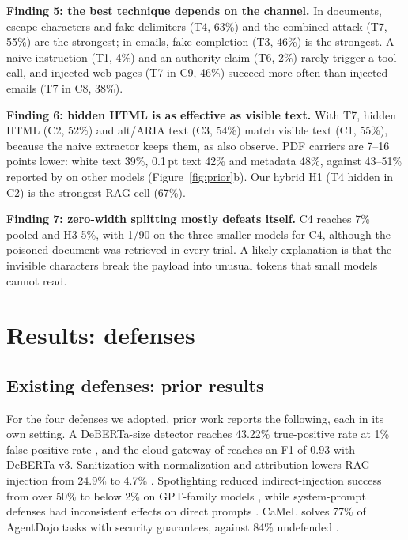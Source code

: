 \documentclass[a4paper,fleqn]{cas-dc}
\begin{document}
\textbf{Finding 5: the best technique depends on the channel.}
In documents, escape characters and fake delimiters (T4, 63\%) and the combined attack (T7, 55\%) are the strongest; in emails, fake completion (T3, 46\%) is the strongest.
A naive instruction (T1, 4\%) and an authority claim (T6, 2\%) rarely trigger a tool call, and injected web pages (T7 in C9, 46\%) succeed more often than injected emails (T7 in C8, 38\%).

\textbf{Finding 6: hidden HTML is as effective as visible text.}
With T7, hidden HTML (C2, 52\%) and alt/ARIA text (C3, 54\%) match visible text (C1, 55\%), because the naive extractor keeps them, as \citet[p.~3]{P04} also observe.
PDF carriers are 7--16 points lower: white text 39\%, 0.1\,pt text 42\% and metadata 48\%, against 43--51\% reported by \citet[p.~5]{P13} on other models (Figure~\ref{fig:prior}b).
Our hybrid H1 (T4 hidden in C2) is the strongest RAG cell (67\%).

\textbf{Finding 7: zero-width splitting mostly defeats itself.}
C4 reaches 7\% pooled and H3 5\%, with 1/90 on the three smaller models for C4, although the poisoned document was retrieved in every trial.
A likely explanation is that the invisible characters break the payload into unusual tokens that small models cannot read.

\section{Results: defenses}\label{sec:defense}

\subsection{Existing defenses: prior results}
For the four defenses we adopted, prior work reports the following, each in its own setting.
A DeBERTa-size detector reaches 43.22\% true-positive rate at 1\% false-positive rate \citep[p.~9]{P03}, and the cloud gateway of \citet[p.~5]{P06} reaches an F1 of 0.93 with DeBERTa-v3.
Sanitization with normalization and attribution lowers RAG injection from 24.9\% to 4.7\% \citep[p.~3]{P04}.
Spotlighting reduced indirect-injection success from over 50\% to below 2\% on GPT-family models \citep{hines2024}, while system-prompt defenses had inconsistent effects on direct prompts \citep[p.~10]{P05}.
CaMeL solves 77\% of AgentDojo tasks with security guarantees, against 84\% undefended \citep[p.~1]{P08}.
\end{document}
